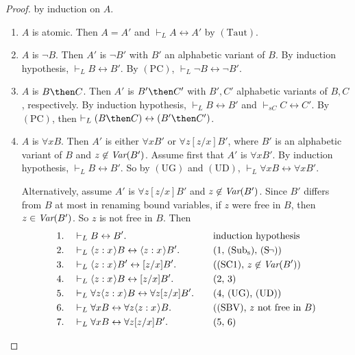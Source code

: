 \documentclass[11pt]{woarticle}
\theoremstyle{break}
\theoremstyle{nonumberplain}
\newcommand{\1}{\;\,|\;\,}
\newcommand{\var}{\emph{Var}}
\renewcommand{\t}[1]{\ensuremath{\langle #1  \makebox[.2ex]{}\rangle}}
\newcommand{\T}[1]{\ensuremath{(\mathrm{ #1})}}
\begin{document}
\begin{proof} by induction on $A$.

  \begin{enumerate}

  \item $A$ is atomic.\; Then $A=A'$ and $\vdash_L A \leftrightarrow
    A'$ by \T{Taut}.

  \item $A$ is $\neg B$.\; Then $A'$ is $\neg B'$ with $B'$ an
    alphabetic variant of $B$. By induction hypothesis, $\vdash_{L} B
    \leftrightarrow B'$. By \T{PC}, $\vdash_{L} \neg B \leftrightarrow
    \neg B'$.

  \item $A$ is $B \then C$.\; Then $A'$ is $B' \then C'$ with $B',C'$
    alphabetic variants of $B,C$, respectively. By induction
    hypothesis, $\vdash_{L} B \leftrightarrow B'$ and $\vdash_{s{C}} C
    \leftrightarrow C'$. By \T{PC}, then $\vdash_{L} (B \then C)
    \leftrightarrow (B' \then C')$.

  \item $A$ is $\forall x B$.\; Then $A'$ is either $\forall x B'$ or
    $\forall z [z/x]B'$, where $B'$ is an alphabetic variant of $B$
    and $z\not\in \var(B')$.  Assume first that $A'$ is $\forall x
    B'$. By induction hypothesis, $\vdash_{L} B \leftrightarrow
    B'$. So by \T{UG} and \T{UD}, $\vdash_L \forall x B
    \leftrightarrow \forall x B'$.

    Alternatively, assume $A'$ is $\forall z [z/x]B'$ and $z\not\in
    \var(B')$. Since $B'$ differs from $B$ at most in renaming bound
    variables, if $z$ were free in $B$, then $z \in \var(B')$. So $z$
    is not free in $B$. Then
    \begin{alignat*}{2}
      1.\quad&\vdash_{L} B \leftrightarrow B'. &\quad&\text{induction hypothesis}\\
      2.\quad&\vdash_{L} \t{z:x}B \leftrightarrow \t{z:x}B'. 
         &\quad&\text{(1, \T{Sub_s}, \T{S\!\neg})}\\
      3.\quad&\vdash_{L} \t{z:x}B' \leftrightarrow [z/x]B'.
         &\quad&\text{(\T{SC1}, $z \not\in \var(B')$)}\\
      4.\quad&\vdash_{L} \t{z:x}B \leftrightarrow [z/x]B'.
         &\quad&\text{(2, 3)}\\
      5.\quad&\vdash_{L} \forall z\t{z:x}B \leftrightarrow \forall z[z/x]B'. 
         &&\text{(4, \T{UG}, \T{UD})}\\
      6.\quad&\vdash_{L} \forall x B \leftrightarrow \forall z\t{z:x}B. 
         &&\text{(\T{SBV}, $z$ not free in $B$)}\\
      7.\quad&\vdash_{L} \forall x B \leftrightarrow \forall z[z/x]B'. 
         &&\text{(5, 6)}
    \end{alignat*}


\end{enumerate}
\end{proof}
\end{document}

